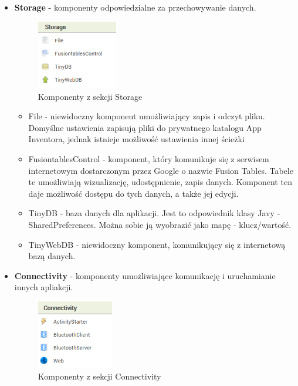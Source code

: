 \begin{itemize}
\item \textbf{Storage} - komponenty odpowiedzialne za przechowywanie danych.

\begin{figure}[H] 
\centering\includegraphics[height=3cm]{figures/components/storage}
\caption{Komponenty z sekcji Storage}
\end{figure}

\begin{itemize}
\item File - niewidoczny komponent umożliwiający zapis i odczyt pliku. Domyślne ustawienia zapisują pliki do prywatnego katalogu App Inventora, jednak istnieje możliwość ustawienia innej ścieżki
\item FusiontablesControl - komponent, który komunikuje się z serwisem internetowym dostarczonym przez Google o nazwie Fusion Tables. Tabele te umożliwiają wizualizację, udostępnienie, zapis danych. Komponent ten daje możliwość dostępu do tych danych, a także jej edycji.
\item TinyDB - baza danych dla aplikacji. Jest to odpowiednik klasy Javy - SharedPreferences. Można sobie ją wyobrazić jako mapę - klucz/wartość.
\item TinyWebDB - niewidoczny komponent, komunikujący się z internetową bazą danych.
\end{itemize}

\item \textbf{Connectivity} - komponenty umożliwiające komunikację i uruchamianie innych apliakcji.
\begin{figure}[H] 
\centering\includegraphics[height=3cm]{figures/components/connectivity}
\caption{Komponenty z sekcji Connectivity}
\end{figure}


\end{itemize}
